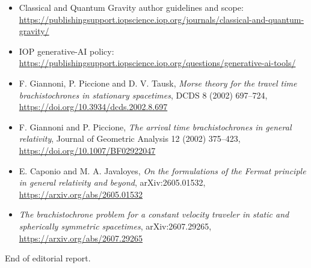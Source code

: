 \documentclass[11pt,a4paper]{article}
\begin{document}
\begin{itemize}
  \item Classical and Quantum Gravity author guidelines and scope:
  \url{https://publishingsupport.iopscience.iop.org/journals/classical-and-quantum-gravity/}
  \item IOP generative-AI policy:
  \url{https://publishingsupport.iopscience.iop.org/questions/generative-ai-tools/}
  \item F. Giannoni, P. Piccione and D. V. Tausk, \emph{Morse theory for the travel time
  brachistochrones in stationary spacetimes}, DCDS 8 (2002) 697--724,
  \url{https://doi.org/10.3934/dcds.2002.8.697}
  \item F. Giannoni and P. Piccione, \emph{The arrival time brachistochrones in general
  relativity}, Journal of Geometric Analysis 12 (2002) 375--423,
  \url{https://doi.org/10.1007/BF02922047}
  \item E. Caponio and M. A. Javaloyes, \emph{On the formulations of the Fermat principle in
  general relativity and beyond}, arXiv:2605.01532,
  \url{https://arxiv.org/abs/2605.01532}
  \item \emph{The brachistochrone problem for a constant velocity traveler in static and
  spherically symmetric spacetimes}, arXiv:2607.29265,
  \url{https://arxiv.org/abs/2607.29265}
\end{itemize}

\vfill
\begin{center}
  \small End of editorial report.
\end{center}
\end{document}
